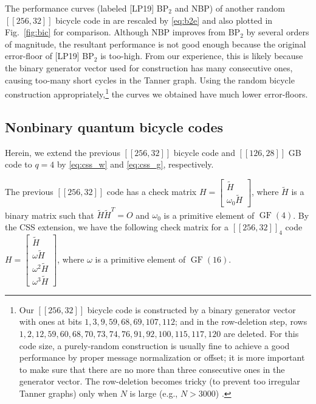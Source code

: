 \documentclass{ieeeaccess}
\DeclareMathOperator{\GF}{GF}
\theoremstyle{definition}		%
\begin{document}
 

The  performance curves (labeled [LP19] BP$_2$ and NBP) of another random $[[256,32]]$ bicycle code in \cite{LP19}
are  rescaled by \eqref{eq:b2e} and also plotted in Fig.~\ref{fig:bic} for comparison. 
%
Although NBP improves from BP$_2$ by several orders of magnitude, the resultant performance is not good enough because the original error-floor of [LP19] BP$_2$ is too-high.
From our experience, this is likely because the binary generator vector used for construction has many consecutive ones, causing too-many short cycles in the Tanner graph.
Using the random bicycle construction appropriately,\footnote{
	Our $[[256,32]]$ bicycle code is constructed by a binary generator vector with ones at bits 
	$1,     3,     9,    59,    68,    69,   107,   112$; 
	and in the row-deletion step, rows 
	$1,     2,    12,    59,    60,    68,    70,    73,    74,    76,    91,    92,   100,   115,   117,   120$ are deleted.
	For this code size, a purely-random construction is usually fine to achieve a good performance by proper message normalization or offset;
		it is more important to make sure that there are no more than three consecutive ones in the generator vector.
		The row-deletion  becomes tricky (to prevent  too irregular Tanner graphs) only when $N$ is large (e.g., $N>3000$) \cite{KL20b}.
	}
the curves we obtained have much lower error-floors.




\subsection{Nonbinary quantum bicycle codes}

Herein, we extend the previous $[[256,32]]$ bicycle code and $[[126,28]]$ GB code to $q=4$ by \eqref{eq:css_w} and \eqref{eq:css_g}, respectively.


The previous $[[256,32]]$ code has a check matrix $H = \left[ \begin{smallmatrix} \tilde H \\ \omega_0\tilde H \end{smallmatrix} \right]$,
where $\tilde H$ is a binary matrix such that $\tilde H \tilde H^T=O$ and $\omega_0$ is a primitive element of $\GF(4)$.
By the   CSS extension, we  have the following check matrix for a $[[256,32]]_{4}$ code
%
	$H = \left[ \begin{smallmatrix} \tilde H \\ \omega\tilde H \\ \omega^2\tilde H\\ \omega^3\tilde H \end{smallmatrix} \right]$,
%
where $\omega$ is a primitive element of $\GF(16)$.
\end{document}
